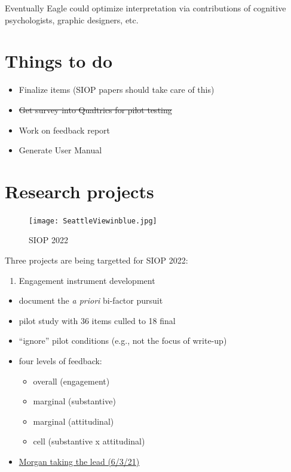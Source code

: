 \documentclass[
]{book}
\providecommand{\tightlist}{%
  \setlength{\itemsep}{0pt}\setlength{\parskip}{0pt}}
\begin{document}
Eventually Eagle could optimize interpretation via contributions of cognitive psychologists, graphic designers, etc.

\hypertarget{things-to-do}{%
\section{Things to do}\label{things-to-do}}

\begin{itemize}
\tightlist
\item
  Finalize items (SIOP papers should take care of this)
\item
  \sout{Get survey into Qualtrics for pilot testing}
\item
  Work on feedback report
\item
  Generate User Manual
\end{itemize}

\hypertarget{research-projects}{%
\section{Research projects}\label{research-projects}}

\begin{figure}
\centering
\texttt{[image: SeattleViewinblue.jpg]}
\caption{SIOP 2022}
\end{figure}

Three projects are being targetted for SIOP 2022:

\begin{enumerate}
\def\labelenumi{\arabic{enumi}.}
\tightlist
\item
  Engagement instrument development
\end{enumerate}

\begin{itemize}
\tightlist
\item
  document the \emph{a priori} bi-factor pursuit
\item
  pilot study with 36 items culled to 18 final
\item
  ``ignore'' pilot conditions (e.g., not the focus of write-up)
\item
  four levels of feedback:

  \begin{itemize}
  \tightlist
  \item
    overall (engagement)
  \item
    marginal (substantive)
  \item
    marginal (attitudinal)
  \item
    cell (substantive x attitudinal)
  \end{itemize}
\item
  \href{https://github.com/Morgan-Russell/SIOP-Engagement}{Morgan taking the lead (6/3/21)}
\end{itemize}
\end{document}
